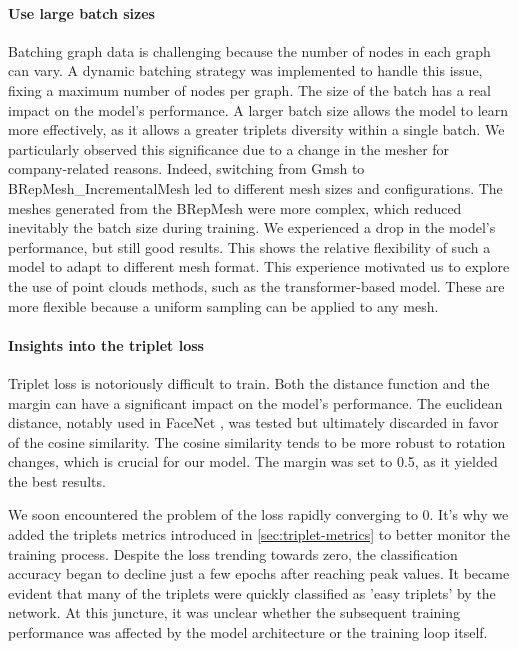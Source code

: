 \paragraph{Use large batch sizes}

Batching graph data is challenging because the number of nodes in each graph can vary. A dynamic batching strategy was implemented to handle this issue, fixing a maximum number of nodes per graph.
The size of the batch has a real impact on the model's performance. A larger batch size allows the model to learn more effectively, as it allows a greater triplets diversity within a single batch. We particularly observed this significance due to a change in the mesher for company-related reasons. Indeed, switching from Gmsh \cite{GmshThreedimensionalFinite} to BRepMesh\_IncrementalMesh \cite{BRepMesh_IncrementalMeshClassReference} led to different mesh sizes and configurations. The meshes generated from the BRepMesh were more complex, which reduced inevitably the batch size during training. We experienced a drop in the model's performance, but still good results. This shows the relative flexibility of such a model to adapt to different mesh format. This experience motivated us to explore the use of point clouds methods, such as the transformer-based model. These are more flexible because a uniform sampling can be applied to any mesh.

\paragraph{Insights into the triplet loss}

Triplet loss is notoriously difficult to train. Both the distance function and the margin can have a significant impact on the model's performance. The euclidean distance, notably used in FaceNet \cite{schroffFaceNetUnifiedEmbedding2015}, was tested but ultimately discarded in favor of the cosine similarity. The cosine similarity tends to be more robust to rotation changes, which is crucial for our model. The margin was set to 0.5, as it yielded the best results.

We soon encountered the problem of the loss rapidly converging to 0. It's why we added the triplets metrics introduced in \autoref{sec:triplet-metrics} to better monitor the training process.
Despite the loss trending towards zero, the classification accuracy began to decline just a few epochs after reaching peak values.
It became evident that many of the triplets were quickly classified as 'easy triplets' by the network. At this juncture, it was unclear whether the subsequent training performance was affected by the model architecture or the training loop itself.

